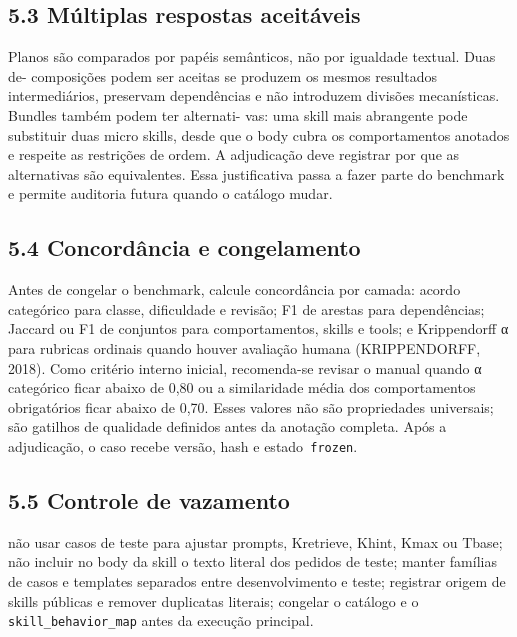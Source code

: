 \documentclass[12pt,a4paper]{article}
\begin{document}
\subsection*{5.3 Múltiplas respostas aceitáveis}

Planos são comparados por papéis semânticos, não por igualdade textual. Duas de- composições podem ser aceitas se produzem os mesmos resultados intermediários, preservam dependências e não introduzem divisões mecanísticas. Bundles também podem ter alternati- vas: uma skill mais abrangente pode substituir duas micro skills, desde que o body cubra os comportamentos anotados e respeite as restrições de ordem. A adjudicação deve registrar por que as alternativas são equivalentes. Essa justificativa passa a fazer parte do benchmark e permite auditoria futura quando o catálogo mudar.


\subsection*{5.4 Concordância e congelamento}

Antes de congelar o benchmark, calcule concordância por camada: acordo categórico para classe, dificuldade e revisão; F1 de arestas para dependências; Jaccard ou F1 de conjuntos para comportamentos, skills e tools; e Krippendorff α para rubricas ordinais quando houver avaliação humana (KRIPPENDORFF, 2018). Como critério interno inicial, recomenda-se revisar o manual quando α categórico ficar abaixo de 0,80 ou a similaridade média dos comportamentos obrigatórios ficar abaixo de 0,70. Esses valores não são propriedades universais; são gatilhos de qualidade definidos antes da anotação completa. Após a adjudicação, o caso recebe versão, hash e estado\texttt{ frozen}.


\subsection*{5.5 Controle de vazamento}

\noindent \textbullet{} não usar casos de teste para ajustar prompts, Kretrieve, Khint, Kmax ou Tbase; \textbullet{} não incluir no body da skill o texto literal dos pedidos de teste; \textbullet{} manter famílias de casos e templates separados entre desenvolvimento e teste; \textbullet{} registrar origem de skills públicas e remover duplicatas literais; \textbullet{} congelar o catálogo e o\texttt{ skill\_behavior\_map} antes da execução principal.\par
\end{document}
